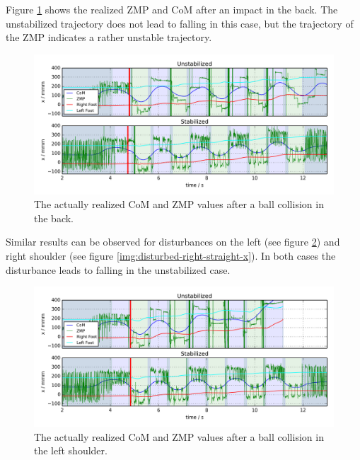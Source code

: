 \documentclass[english,ngerman]{KITreprt}
\begin{document}
Figure \ref{img:disturbed-back-straight-x} shows the realized ZMP and
CoM after an impact in the back. The unstabilized trajectory does not
lead to falling in this case, but the trajectory of the ZMP indicates a
rather unstable trajectory.

\begin{figure}[hbt]
\vspace*{-1em}
\includegraphics[width=\textwidth,resolution=300]{images/disturbed_back_straight_x.png}
\caption{The actually realized CoM and ZMP values after a ball collision in the back.}
\label{img:disturbed-back-straight-x}
\end{figure}

Similar results can be observed for disturbances on the left (see figure
\ref{img:disturbed-left-straight-x}) and right shoulder (see figure
\ref{img:disturbed-right-straight-x}). In both cases the disturbance
leads to falling in the unstabilized case.

\begin{figure}[hbt]
\vspace*{-1em}
\includegraphics[width=\textwidth,resolution=300]{images/disturbed_left_straight_x.png}
\caption{The actually realized CoM and ZMP values after a ball collision in the left shoulder.}
\label{img:disturbed-left-straight-x}
\end{figure}
\end{document}
